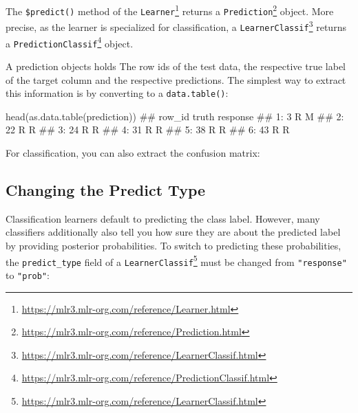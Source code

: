 \documentclass[12pt,]{scrbook}
\newenvironment{Shaded}{}{}
\newcommand{\KeywordTok}[1]{\textcolor[rgb]{0.00,0.00,1.00}{#1}}
\newcommand{\NormalTok}[1]{#1}
\newcommand{\OperatorTok}[1]{#1}
\renewcommand{\href}[2]{#2\footnote{\url{#1}}}
\begin{document}
The \texttt{\$predict()} method of the \href{https://mlr3.mlr-org.com/reference/Learner.html}{\texttt{Learner}} returns a \href{https://mlr3.mlr-org.com/reference/Prediction.html}{\texttt{Prediction}} object.
More precise, as the learner is specialized for classification, a \href{https://mlr3.mlr-org.com/reference/LearnerClassif.html}{\texttt{LearnerClassif}} returns a \href{https://mlr3.mlr-org.com/reference/PredictionClassif.html}{\texttt{PredictionClassif}} object.

A prediction objects holds The row ids of the test data, the respective true label of the target column and the respective predictions.
The simplest way to extract this information is by converting to a \texttt{data.table()}:

\begin{Shaded}
\begin{Highlighting}[]
\KeywordTok{head}\NormalTok{(}\KeywordTok{as.data.table}\NormalTok{(prediction))}
\NormalTok{##    row_id truth response}
\NormalTok{## 1:      3     R        M}
\NormalTok{## 2:     22     R        R}
\NormalTok{## 3:     24     R        R}
\NormalTok{## 4:     31     R        R}
\NormalTok{## 5:     38     R        R}
\NormalTok{## 6:     43     R        R}
\end{Highlighting}
\end{Shaded}

For classification, you can also extract the confusion matrix:

\begin{Shaded}
\end{Shaded}

\hypertarget{predict-type}{%
\subsection{Changing the Predict Type}\label{predict-type}}

Classification learners default to predicting the class label.
However, many classifiers additionally also tell you how sure they are about the predicted label by providing posterior probabilities.
To switch to predicting these probabilities, the \texttt{predict\_type} field of a \href{https://mlr3.mlr-org.com/reference/LearnerClassif.html}{\texttt{LearnerClassif}} must be changed from \texttt{"response"} to \texttt{"prob"}:
\end{document}
